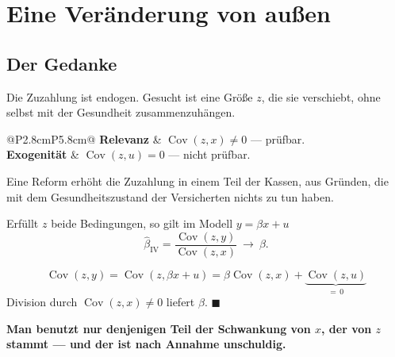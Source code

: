 \chapter{Eine Veränderung von außen}

\section{Der Gedanke}

\begin{merksatz}
Die Zuzahlung ist endogen. Gesucht ist eine Größe $z$, die sie verschiebt, ohne selbst mit der Gesundheit zusammenzuhängen.

\begin{center}
{\small
\renewcommand{\arraystretch}{1.55}
\begin{tabular}{@{}P{2.8cm}P{5.8cm}@{}}
\toprule
\textbf{Relevanz} & $\operatorname{Cov}(z,x) \ne 0$ --- prüfbar.\\
\textbf{Exogenität} & $\operatorname{Cov}(z,u) = 0$ --- nicht prüfbar.\\
\bottomrule
\end{tabular}}
\end{center}

\begin{center}
\begin{minipage}{0.88\textwidth}
\end{minipage}
\end{center}

Eine Reform erhöht die Zuzahlung in einem Teil der Kassen, aus Gründen, die mit dem Gesundheitszustand der Versicherten nichts zu tun haben.
\end{merksatz}

\begin{merksatz}
Erfüllt $z$ beide Bedingungen, so gilt im Modell $y = \beta x + u$
\[ \hat\beta_{\text{IV}} = \frac{\operatorname{Cov}(z,y)}{\operatorname{Cov}(z,x)} \ \longrightarrow\ \beta . \]

\[ \operatorname{Cov}(z,y) = \operatorname{Cov}(z,\beta x + u) = \beta\operatorname{Cov}(z,x) + \underbrace{\operatorname{Cov}(z,u)}_{=\,0} \]
Division durch $\operatorname{Cov}(z,x) \ne 0$ liefert $\beta$. $\blacksquare$

\begin{center}
\begin{minipage}{0.9\textwidth}
\textbf{Man benutzt nur denjenigen Teil der Schwankung von $x$, der von $z$ stammt --- und der ist nach Annahme unschuldig.}
\end{minipage}
\end{center}
\end{merksatz}


